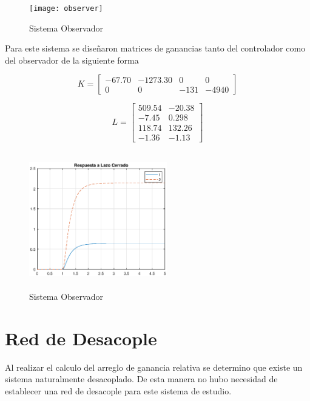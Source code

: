 \documentclass[journal,twoside,web]{ieeecolor}
\begin{document}
	\begin{figure}[h]
		\begin{center}
			\texttt{[image: observer]}
			\caption{ Sistema Observador \label{observer}}
		\end{center}
	\end{figure}
	
	Para este sistema se diseñaron matrices de ganancias tanto del controlador como del observador de la siguiente forma
	
	\begin{equation}
		K = \begin{bmatrix}
				-67.70 & -1273.30 & 0 & 0 \\
				0 & 0 & -131 & -4940
		\end{bmatrix}
	\end{equation}
	
	\begin{equation}
		L = \begin{bmatrix}
			509.54 & -20.38 \\
			-7.45 & 0.298 \\
			118.74 & 132.26 \\
			-1.36 & -1.13
		\end{bmatrix}
	\end{equation}

	\begin{figure}[h]
		\begin{center}
			\includegraphics[width=6cm,height=6cm,keepaspectratio]{ssresposen}
			\caption{ Sistema Observador \label{ssresposen}}
		\end{center}
	\end{figure}

\section{Red de Desacople}

Al realizar el calculo del arreglo de ganancia relativa se determino que existe un sistema naturalmente desacoplado. De esta manera no hubo necesidad de establecer una red de desacople para este sistema de estudio.
	
\end{document}
